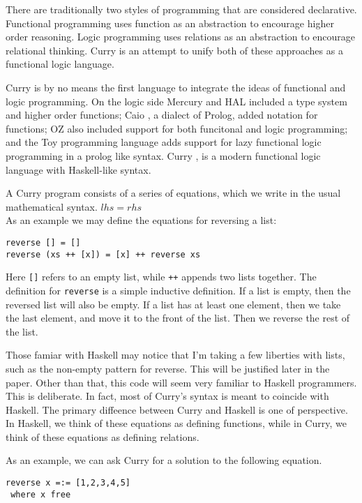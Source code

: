 
There are traditionally two styles of programming that are considered declarative.
Functional programming uses function as an abstraction to encourage higher order reasoning.
Logic programming uses relations as an abstraction to encourage relational thinking.
Curry is an attempt to unify both of these approaches as a functional logic language.

Curry is by no means the first language to integrate the ideas of functional and logic programming.
On the logic side Mercury \cite{} and HAL \cite{} included a type system and higher order functions;
Caio \cite{}, a dialect of Prolog, added notation for functions;
OZ \cite{} also included support for both funcitonal and logic programming;
and the Toy programming language \cite{} adds support for lazy functional logic programming in a prolog like syntax.
Curry \cite{}, is a modern functional logic language with Haskell-like syntax.

A Curry program consists of a series of equations,
which we write in the usual mathematical syntax.
$lhs = rhs$\\

As an example we may define the equations for reversing a list:
\begin{verbatim}
reverse [] = []
reverse (xs ++ [x]) = [x] ++ reverse xs
\end{verbatim}

Here \texttt{[]} refers to an empty list, while \texttt{++} appends two lists together.
The definition for \texttt{reverse} is a simple inductive definition.
If a list is empty, then the reversed list will also be empty.
If a list has at least one element, then we take the last element, and move it to the front of the list.
Then we reverse the rest of the list.

Those famiar with Haskell may notice that I'm taking a few liberties with lists,
such as the non-empty pattern for reverse.  This will be justified later in the paper.
Other than that, this code will seem very familiar to Haskell programmers.
This is deliberate.  
In fact, most of Curry's syntax is meant to coincide with Haskell.
The primary diffeence between Curry and Haskell is one of perspective.
In Haskell, we think of these equations as defining functions,
while in Curry, we think of these equations as defining relations.

As an example, we can ask Curry for a solution to the following equation.

\begin{verbatim}
reverse x =:= [1,2,3,4,5]
 where x free
\end{verbatim}

